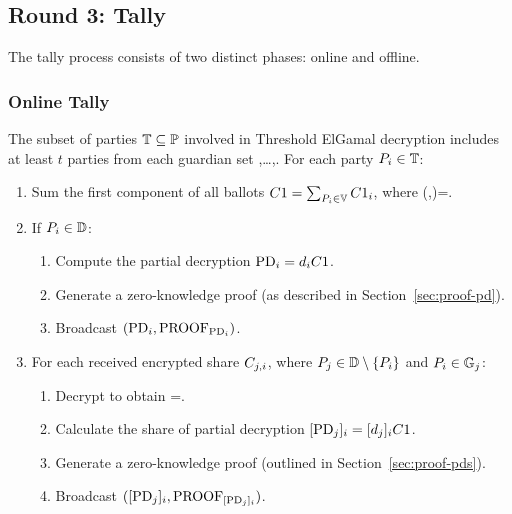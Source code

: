 \documentclass[runningheads]{llncs}
\begin{document}
\subsection{Round 3: Tally}

The tally process consists of two distinct phases: online and offline.

\subsubsection{Online Tally}

The subset of parties $\mathbb{T} \subseteq \mathbb{P}$ involved in Threshold ElGamal decryption includes at least $t$ parties from each guardian set ,\dots,\GuardianSetOf{|\SetOfFDKG|}. For each party $P_{i} \in \mathbb{T}$:


\begin{enumerate}
    \item Sum the first component of all ballots $C1 = \sum_{P_{i} \in \mathbb{V}} C1_{i}$, where (,)=.

    \item If $P_{i} \in \mathbb{D}$:
        \begin{enumerate}
            \item Compute the partial decryption $\mathrm{PD}_{i} = d_{i} C1$.
            \item Generate a zero-knowledge proof  (as described in Section~\ref{sec:proof-pd}).
            \item Broadcast $(\mathrm{PD}_{i},\textrm{PROOF}_{\mathrm{PD}_{i}})$.
        \end{enumerate}
    
    \item For each received encrypted share $C_{j,i}$, where $P_{j} \in \mathbb{D} \setminus \{P_{i}\}$ and $P_{i} \in \mathbb{G}_{j}$:
        \begin{enumerate}
            \item Decrypt to obtain =.
            \item Calculate the share of partial decryption $[\mathrm{PD}_{j}]_{i} = [d_{j}]_{i} C1$.
            \item Generate a zero-knowledge proof  (outlined in Section~\ref{sec:proof-pds}).
            \item Broadcast $([\mathrm{PD}_{j}]_{i},\textrm{PROOF}_{[\mathrm{PD}_{j}]_{i}})$.
        \end{enumerate}
\end{enumerate}
\end{document}
